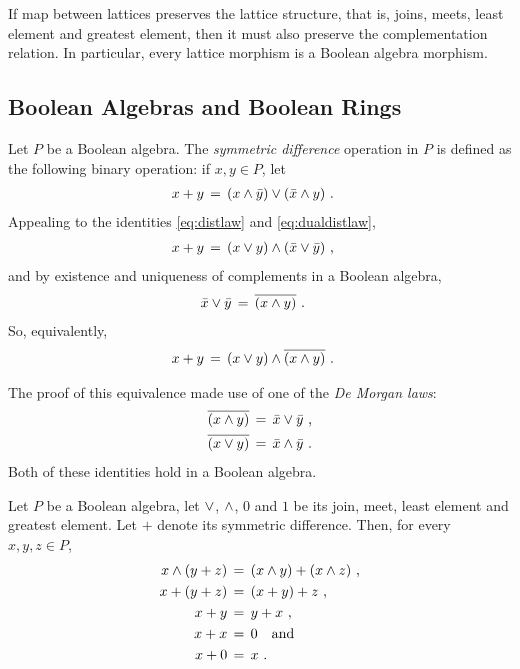 \begin{remarkBoolAlgIsFullInLat}
	If map between lattices preserves the lattice structure, that is,
	joins, meets, least element and greatest element, then it must
	also preserve the complementation relation. In particular, every
	lattice morphism is a Boolean algebra morphism.
\end{remarkBoolAlgIsFullInLat}

\subsection{Boolean Algebras and Boolean Rings}
Let $P$ be a Boolean algebra. The \emph{symmetric difference} operation
in $P$ is defined as the following binary operation: if $x,y\in P$, let
\begin{align*}
	x + y & \,=\, (x\wedge\bar{y})\vee(\bar{x}\wedge y)
	\text{ .}
\end{align*}
%
Appealing to the identities \eqref{eq:distlaw} and \eqref{eq:dualdistlaw},
\begin{align*}
	x + y & \,=\, (x\vee y)\wedge(\bar{x}\vee\bar{y})
	\text{ ,}
\end{align*}
%
and by existence and uniqueness of complements in a Boolean algebra,
\begin{align*}
	\bar{x}\vee\bar{y} & \,=\, \overline{(x\wedge y)}
	\text{ .}
\end{align*}
%
So, equivalently,
\begin{align*}
	x + y & \,=\, (x\vee y)\wedge\overline{(x\wedge y)}
	\text{ .}
\end{align*}
%

The proof of this equivalence made use of one of the \emph{De Morgan laws}:
\begin{equation}
	\label{eq:demorganlaws}
	\begin{aligned}
		\overline{(x\wedge y)} & \,=\, \bar{x}\vee\bar{y}
			\text{ ,}\\
		\overline{(x\vee y)}& \,=\, \bar{x}\wedge\bar{y}
		\text{ .}
	\end{aligned}
\end{equation}
%
Both of these identities hold in a Boolean algebra.

\begin{thmBoolAlgIsBoolRng}\label{thm:boolalgisboolrng}
	Let $P$ be a Boolean algebra, let $\vee$, $\wedge$, $0$ and
	$1$ be its join, meet, least element and greatest element. Let
	$+$ denote its symmetric difference. Then, for every $x,y,z\in P$,
	\begin{align*}
		x\wedge (y+z) & \,=\, (x\wedge y) + (x\wedge z)
			\text{ ,} \\
		x + (y+z) & \,=\, (x+y) + z\text{ ,} \\
		x + y & \,=\, y + x \text{ ,} \\
		x + x & \,=\, 0\quad\text{and} \\
		x + 0 & \,=\, x
		\text{ .}
	\end{align*}
\end{thmBoolAlgIsBoolRng}

